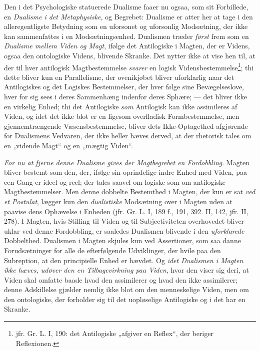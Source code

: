 \documentclass[12pt,a4paper]{book}
\newcommand{\opage}[1]{\marginnote{\footnotesize\textit{[#1]}}}
\begin{document}
Den i det Psychologiske statuerede Dualisme faaer nu ogsaa, som sit Forbillede, en
\emph{Dualisme i det Metaphysiske}, og Begrebet: Dualisme er atter her at tage i den
alleregentligste Betydning som en uforsonet og uforsonlig Modsætning, der ikke kan
sammenfattes i en Modsætningsenhed. Dualismen træder \emph{først} frem som en \emph{Dualisme mellem
Viden og Magt}, ifølge det Antilogiske i Magten, der er Videns, ogsaa den ontologiske Videns,
blivende Skranke. Det nytter ikke at vise hen til, at der til hver antilogisk
Magtbestemmelse \emph{svarer} en logisk Vidensbestemmelse\footnote{jfr. Gr. L. I, 190: det
Antilogiske „afgiver en Reflex“, der beriger Reflexionen.}; thi dette bliver kun en
Parallelisme, der ovenikjøbet bliver uforklarlig naar det Antilogiskes og det Logiskes
Bestemmelser, der hver følge sine Bevægelseslove, hver for sig sees i deres Sammenhæng
indenfor deres Sphære; --- det bliver ikke en virkelig Enhed; thi det Antilogiske \emph{som} Antilogisk kan ikke assimileres af Viden, og idet det ikke blot er en ligesom overfladisk
Formbestemmelse, men gjennemtrængende Væsensbestemmelse, bliver dets Ikke-Optagethed
afgjørende for Dualismens Vedvaren, der ikke heller hæves derved, at der rhetorisk tales om
en „vidende Magt“ og en „mægtig Viden“.

\emph{For nu at fjerne denne Dualisme gives der Magtbegrebet en Fordobbling}. Magten
bliver bestemt som den, der, ifølge sin oprindelige indre Enhed med Viden, paa een Gang er
ideel og reel; der tales saavel om logiske som om antilogiske Magtbestemmelser. Men denne
dobbelte Bestemthed i Magten, der kun er sat \emph{ved et Postulat}, lægger kun den \emph{dualistiske}
Modsætning over i Magten uden at paavise dens Ophævelse i Enheden (jfr. Gr. L. I, 189 f.,
191, 392. II, 142, jfr. II, 278). I Magten, hvis \opage{174}Stilling til Viden og til Subjectiviteten
overhovedet bliver uklar ved denne Fordobbling, er saaledes Dualismen blivende i den \emph{uforklarede} Dobbelthed. Dualismen i Magten skjules kun ved Assertioner, som saa danne
Forudsætninger for alle de efterfølgende Udviklinger, der hvile paa den Subreption, at den
principielle Enhed er hævdet. Og \emph{idet Dualismen i Magten ikke hæves, udøver den en Tilbagevirkning paa Viden}, hvor den viser sig deri, at Viden skal omfatte baade hvad
den assimilerer og hvad den ikke assimilerer; denne Adskillelse gjælder nemlig ikke blot om
den menneskelige Viden, men om den ontologiske, der forholder sig til det uopløselige
Antilogiske og i det har en Skranke.
\end{document}
